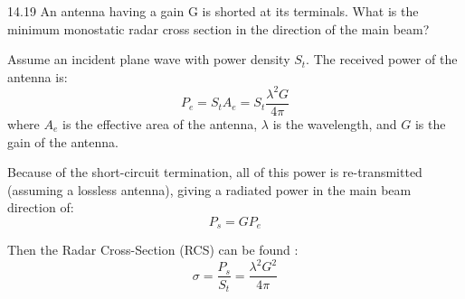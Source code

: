 \documentclass[cn,12pt]{homework}
\begin{document}
14.19 An antenna having a gain G is shorted at its terminals. What is the minimum monostatic radar cross
section in the direction of the main beam?
\begin{solution}
  Assume an incident plane wave with power density \( S_t \). The received power of the antenna is:
\[ P_e = S_t A_e = S_t \frac{\lambda^2 G}{4\pi} \]
where \( A_e \) is the effective area of the antenna, \( \lambda \) is the wavelength, and \( G \) is the gain of the antenna.

Because of the short-circuit termination, all of this power is re-transmitted (assuming a lossless antenna), giving a radiated power in the main beam direction of:
\[ P_s = G P_e \]

Then the Radar Cross-Section (RCS) can be found :
\[ \sigma = \frac{P_s}{S_t} = \frac{\lambda^2 G^2}{4\pi} \]
\end{solution}
\newpage
\end{document}
